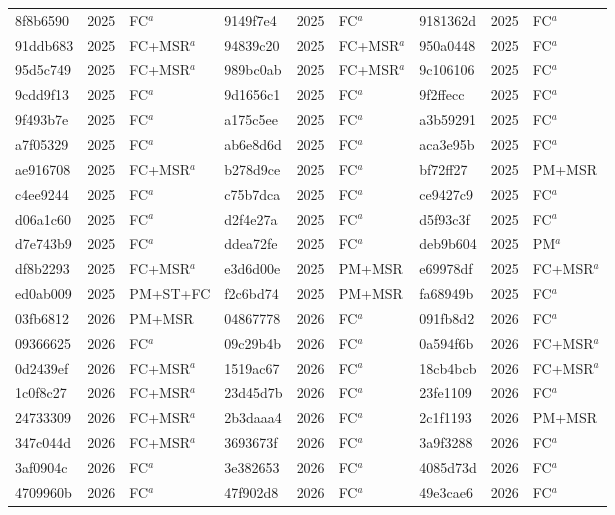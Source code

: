 \begin{longtable}{lll@{\hspace{10pt}}lll@{\hspace{10pt}}lll}
8f8b6590 & 2025 & FC$^{a}$ & 9149f7e4 & 2025 & FC$^{a}$ & 9181362d & 2025 & FC$^{a}$ \\
91ddb683 & 2025 & FC+MSR$^{a}$ & 94839c20 & 2025 & FC+MSR$^{a}$ & 950a0448 & 2025 & FC$^{a}$ \\
95d5c749 & 2025 & FC+MSR$^{a}$ & 989bc0ab & 2025 & FC+MSR$^{a}$ & 9c106106 & 2025 & FC$^{a}$ \\
9cdd9f13 & 2025 & FC$^{a}$ & 9d1656c1 & 2025 & FC$^{a}$ & 9f2ffecc & 2025 & FC$^{a}$ \\
9f493b7e & 2025 & FC$^{a}$ & a175c5ee & 2025 & FC$^{a}$ & a3b59291 & 2025 & FC$^{a}$ \\
a7f05329 & 2025 & FC$^{a}$ & ab6e8d6d & 2025 & FC$^{a}$ & aca3e95b & 2025 & FC$^{a}$ \\
ae916708 & 2025 & FC+MSR$^{a}$ & b278d9ce & 2025 & FC$^{a}$ & bf72ff27 & 2025 & PM+MSR \\
c4ee9244 & 2025 & FC$^{a}$ & c75b7dca & 2025 & FC$^{a}$ & ce9427c9 & 2025 & FC$^{a}$ \\
d06a1c60 & 2025 & FC$^{a}$ & d2f4e27a & 2025 & FC$^{a}$ & d5f93c3f & 2025 & FC$^{a}$ \\
d7e743b9 & 2025 & FC$^{a}$ & ddea72fe & 2025 & FC$^{a}$ & deb9b604 & 2025 & PM$^{a}$ \\
df8b2293 & 2025 & FC+MSR$^{a}$ & e3d6d00e & 2025 & PM+MSR & e69978df & 2025 & FC+MSR$^{a}$ \\
ed0ab009 & 2025 & PM+ST+FC & f2c6bd74 & 2025 & PM+MSR & fa68949b & 2025 & FC$^{a}$ \\
03fb6812 & 2026 & PM+MSR & 04867778 & 2026 & FC$^{a}$ & 091fb8d2 & 2026 & FC$^{a}$ \\
09366625 & 2026 & FC$^{a}$ & 09c29b4b & 2026 & FC$^{a}$ & 0a594f6b & 2026 & FC+MSR$^{a}$ \\
0d2439ef & 2026 & FC+MSR$^{a}$ & 1519ac67 & 2026 & FC$^{a}$ & 18cb4bcb & 2026 & FC+MSR$^{a}$ \\
1c0f8c27 & 2026 & FC+MSR$^{a}$ & 23d45d7b & 2026 & FC$^{a}$ & 23fe1109 & 2026 & FC$^{a}$ \\
24733309 & 2026 & FC+MSR$^{a}$ & 2b3daaa4 & 2026 & FC$^{a}$ & 2c1f1193 & 2026 & PM+MSR \\
347c044d & 2026 & FC+MSR$^{a}$ & 3693673f & 2026 & FC$^{a}$ & 3a9f3288 & 2026 & FC$^{a}$ \\
3af0904c & 2026 & FC$^{a}$ & 3e382653 & 2026 & FC$^{a}$ & 4085d73d & 2026 & FC$^{a}$ \\
4709960b & 2026 & FC$^{a}$ & 47f902d8 & 2026 & FC$^{a}$ & 49e3cae6 & 2026 & FC$^{a}$ \\

\end{longtable}
